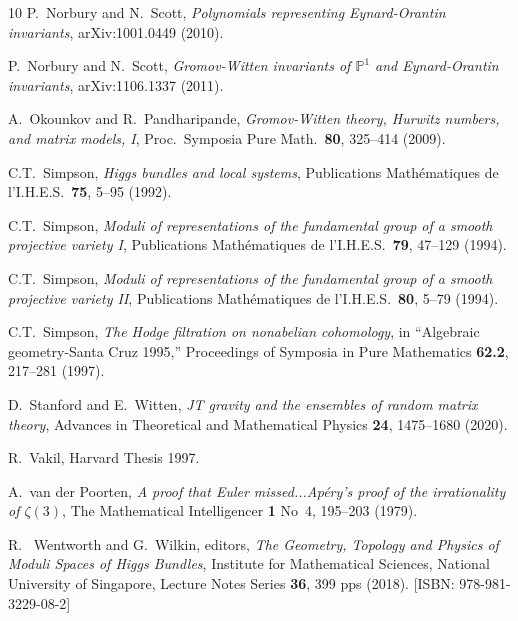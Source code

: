 \documentclass{amsart}
\theoremstyle{definition}
\numberwithin{equation}{section}
\numberwithin{figure}{section}
\newcommand{\bP}{{\mathbb{P}}}
\begin{document}
\begin{thebibliography}{10}
P.~Norbury and N.~Scott,
\emph{Polynomials representing Eynard-Orantin
invariants},
arXiv:1001.0449 (2010).


P.~Norbury and N.~Scott,
\emph{Gromov-Witten invariants of $\bP^1$ 
and Eynard-Orantin invariants},
arXiv:1106.1337 (2011).






A.~Okounkov and R.~Pandharipande,
\emph{Gromov-Witten theory, Hurwitz numbers, and matrix 
models, I}, 
Proc.\ Symposia Pure Math.\ 
 \textbf{80}, 325--414 (2009).









C.T.~Simpson,
\emph{Higgs bundles and local systems},
Publications Math\'ematiques de l'I.H.E.S.\
\textbf{75}, 5--95 (1992).

C.T.~Simpson,
\emph{Moduli of representations of the fundamental group of a smooth projective variety I},
Publications Math\'ematiques de l'I.H.E.S.\
\textbf{79}, 47--129 (1994).

\bibitem{Sim1994b}
C.T.~Simpson,
\emph{Moduli of representations of the fundamental group of a smooth projective variety II},
Publications Math\'ematiques de l'I.H.E.S.\
\textbf{80}, 5--79 (1994).


\bibitem{Sim1997}
C.T.~Simpson,
\emph{The Hodge filtration on nonabelian cohomology}, in ``Algebraic geometry-Santa Cruz 1995,'' Proceedings of Symposia in Pure Mathematics
\textbf{62.2}, 217--281 (1997).
 


D.~Stanford and  E.~Witten, 
\emph{JT gravity and the ensembles of random matrix theory}, 
Advances in Theoretical and Mathematical Physics 
\textbf{24}, 1475--1680 (2020).



 R.~Vakil, Harvard Thesis 1997.


 A.~van der Poorten, 
\emph{A proof that Euler missed...Ap\'ery's proof of the irrationality of $\zeta(3)$}, The Mathematical Intelligencer \textbf{1}  No~4, 195--203
(1979).


\bibitem{WW}
R. ~Wentworth and G.~Wilkin, editors,
\emph{The Geometry, Topology and Physics of Moduli Spaces of Higgs 
Bundles},    
Institute for Mathematical Sciences, National University of Singapore,
Lecture Notes Series \textbf{36}, 399 pps (2018).
[ISBN: 978-981-3229-08-2]



\end{thebibliography}
\end{document}
